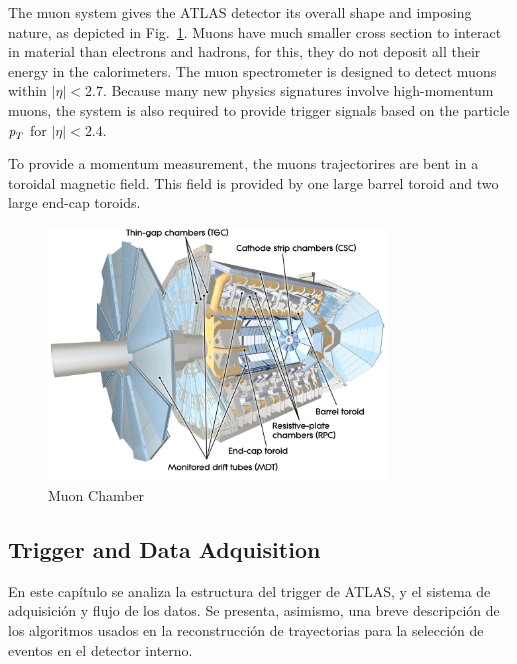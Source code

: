 The muon system gives the ATLAS detector its overall shape and imposing nature, as depicted in Fig.~\ref{fig:MUON1}.
Muons have much smaller cross section to interact in material than electrons and hadrons, for this, they 
do not deposit all their energy in the calorimeters. The muon spectrometer is designed to detect muons within $|\eta|<2.7$. Because many new physics signatures involve high-momentum muons, the system is also required to provide trigger signals based on the particle ${\emph{p}_{T}}$ for  $|\eta|<2.4$.

To provide a momentum measurement, the muons trajectorires are bent in a toroidal magnetic field. This field is provided by one large barrel toroid and two large end-cap toroids.  

 

\begin{figure}[htbp]
  \begin{center}
      \includegraphics[width=0.8\textwidth]{Fig2/MuonChamber.pdf}
    \caption{Muon Chamber}
    \label{fig:MUON1}
  \end{center}
\end{figure}




\subsection{Trigger and Data Adquisition}\label{sec:atlasCALO}
 En este cap\'itulo se analiza la estructura del trigger de ATLAS, y el sistema de adquisici\'on y flujo de los datos. Se presenta, asimismo, una breve descripci\'on de los algoritmos usados en la reconstrucci\'on de trayectorias para la selecci\'on de eventos en el detector interno. 


